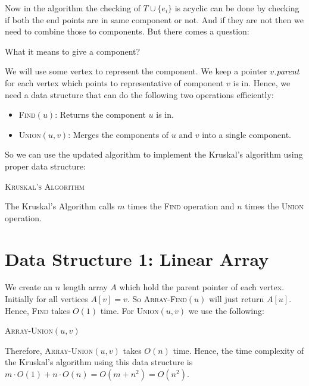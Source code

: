 Now in the algorithm the checking of $T\cup \{e_i\}$ is acyclic can be done by checking if both the end points are in same component or not. And if they are not then we need to combine those to components. But there comes a question:
\begin{question}{}{}
	What it means to give a component?
\end{question}
We will use some vertex to represent the component. We keep a pointer $v.\emph{parent}$ for each vertex which points to representative of component $v$ is in. Hence, we need a data structure that can do the following two operations efficiently:
\begin{itemize}[label=$\bullet$, itemsep=0.2em]
	\item \textsc{Find}$(u)$: Returns the component $u$ is in.
	\item \textsc{Union}$(u,v)$: Merges the components of $u$ and $v$ into a single component.
\end{itemize}
So we can use the updated algorithm to implement the Kruskal's algorithm  using proper data structure:
\begin{algorithm}[htbp]
	\caption{\textsc{Kruskal's Algorithm}}
	\DontPrintSemicolon
\end{algorithm}
The Kruskal's Algorithm calls $m$ times the \textsc{Find} operation and $n$ times the \textsc{Union} operation.
\section{Data Structure 1: Linear Array}
We create an $n$ length array $A$ which hold the parent pointer of each vertex. Initially for all vertices $A[v]=v$. So \textsc{Array-Find}$(u)$ will just return $A[u]$. Hence, \textsc{Find} takes $O(1)$ time. For \textsc{Union}$(u,v)$ we use the following:
\begin{algorithm}[htbp]
	\caption{\textsc{Array-Union}$(u,v)$}
	\DontPrintSemicolon
\end{algorithm}
Therefore, \textsc{Array-Union}$(u,v)$ takes $O(n)$ time. Hence, the time complexity of the Kruskal's algorithm using this data structure is $m\cdot O(1)+n\cdot O(n)=O(m+n^2)=O(n^2)$.
